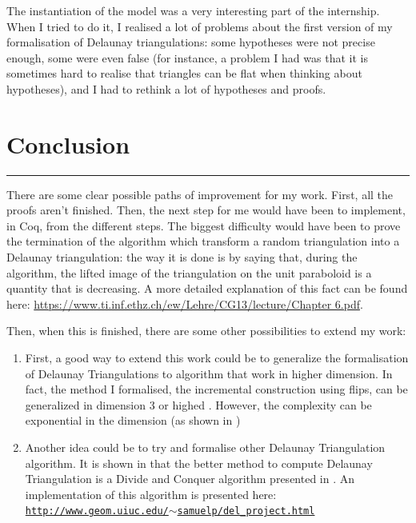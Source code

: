 \documentclass[a4paper,10pt]{article}
\begin{document}
  The instantiation of the model was a very interesting part of the internship. When I tried to do it, I realised a lot of problems about the first version of my formalisation of Delaunay triangulations: some hypotheses were not precise enough, some were even false (for instance, a problem I had was that it is sometimes hard to realise that triangles can be flat when thinking about hypotheses), and I had to rethink a lot of hypotheses and proofs.


\newpage
\section{Conclusion}
\rule{\linewidth}{0.5pt}


There are some clear possible paths of improvement for my work. First, all the proofs aren't finished. Then, the next step for me would have been to implement, in {\sc Coq}, from the different steps. The biggest difficulty would have been to prove the termination of the algorithm which transform a random triangulation into a Delaunay triangulation: the way it is done is by saying that, during the algorithm, the lifted image of the triangulation on the unit paraboloid is a quantity that is decreasing. A more detailed explanation of this fact can be found here:
\href{https://www.ti.inf.ethz.ch/ew/Lehre/CG13/lecture/Chapter 6.pdf}{https://www.ti.inf.ethz.ch/ew/Lehre/CG13/lecture/Chapter 6.pdf}.

Then, when this is finished, there are some other possibilities to extend my work:
\begin{enumerate}
\item First, a good way to extend this work could be to generalize the formalisation of Delaunay Triangulations to algorithm that work in higher dimension. In fact, the method I formalised, the incremental construction using flips, can be generalized in dimension 3 or highed \cite{CompGeoAlgo}. However, the complexity can be exponential in the dimension (as shown in \cite{IncrementalDimension})
\item Another idea could be to try and formalise other Delaunay Triangulation algorithm. It is shown in \cite{Comparison} that the better method to compute Delaunay Triangulation is a Divide and Conquer algorithm presented in \cite{AlgoDivide}. An implementation of this algorithm is presented here:\\
  \href{http://www.geom.uiuc.edu/~samuelp/del_project.html}{{\tt http://www.geom.uiuc.edu/$\sim$samuelp/del\_project.html}}
\end{enumerate}
\end{document}

